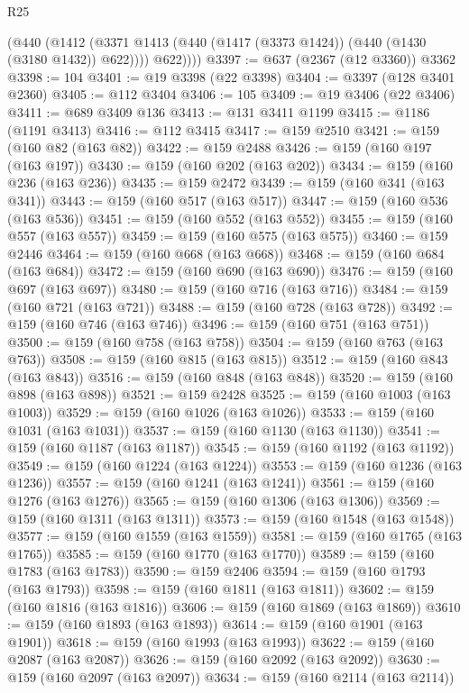 \begin{lexlean}{R25}
\begin{coremodule}
          (@440
            (@1412 (@3371 @1413 (@440 (@1417 (@3373 @1424)) (@440 (@1430 (@3180 @1432)) @622))))
            @622))))
@3397 := @637 (@2367 (@12 @3360)) @3362
@3398 := 104
@3401 := @19 @3398 (@22 @3398)
@3404 := @3397 (@128 @3401 @2360)
@3405 := @112 @3404
@3406 := 105
@3409 := @19 @3406 (@22 @3406)
@3411 := @689 @3409 @136
@3413 := @131 @3411 @1199
@3415 := @1186 (@1191 @3413)
@3416 := @112 @3415
@3417 := @159 @2510
@3421 := @159 (@160 @82 (@163 @82))
@3422 := @159 @2488
@3426 := @159 (@160 @197 (@163 @197))
@3430 := @159 (@160 @202 (@163 @202))
@3434 := @159 (@160 @236 (@163 @236))
@3435 := @159 @2472
@3439 := @159 (@160 @341 (@163 @341))
@3443 := @159 (@160 @517 (@163 @517))
@3447 := @159 (@160 @536 (@163 @536))
@3451 := @159 (@160 @552 (@163 @552))
@3455 := @159 (@160 @557 (@163 @557))
@3459 := @159 (@160 @575 (@163 @575))
@3460 := @159 @2446
@3464 := @159 (@160 @668 (@163 @668))
@3468 := @159 (@160 @684 (@163 @684))
@3472 := @159 (@160 @690 (@163 @690))
@3476 := @159 (@160 @697 (@163 @697))
@3480 := @159 (@160 @716 (@163 @716))
@3484 := @159 (@160 @721 (@163 @721))
@3488 := @159 (@160 @728 (@163 @728))
@3492 := @159 (@160 @746 (@163 @746))
@3496 := @159 (@160 @751 (@163 @751))
@3500 := @159 (@160 @758 (@163 @758))
@3504 := @159 (@160 @763 (@163 @763))
@3508 := @159 (@160 @815 (@163 @815))
@3512 := @159 (@160 @843 (@163 @843))
@3516 := @159 (@160 @848 (@163 @848))
@3520 := @159 (@160 @898 (@163 @898))
@3521 := @159 @2428
@3525 := @159 (@160 @1003 (@163 @1003))
@3529 := @159 (@160 @1026 (@163 @1026))
@3533 := @159 (@160 @1031 (@163 @1031))
@3537 := @159 (@160 @1130 (@163 @1130))
@3541 := @159 (@160 @1187 (@163 @1187))
@3545 := @159 (@160 @1192 (@163 @1192))
@3549 := @159 (@160 @1224 (@163 @1224))
@3553 := @159 (@160 @1236 (@163 @1236))
@3557 := @159 (@160 @1241 (@163 @1241))
@3561 := @159 (@160 @1276 (@163 @1276))
@3565 := @159 (@160 @1306 (@163 @1306))
@3569 := @159 (@160 @1311 (@163 @1311))
@3573 := @159 (@160 @1548 (@163 @1548))
@3577 := @159 (@160 @1559 (@163 @1559))
@3581 := @159 (@160 @1765 (@163 @1765))
@3585 := @159 (@160 @1770 (@163 @1770))
@3589 := @159 (@160 @1783 (@163 @1783))
@3590 := @159 @2406
@3594 := @159 (@160 @1793 (@163 @1793))
@3598 := @159 (@160 @1811 (@163 @1811))
@3602 := @159 (@160 @1816 (@163 @1816))
@3606 := @159 (@160 @1869 (@163 @1869))
@3610 := @159 (@160 @1893 (@163 @1893))
@3614 := @159 (@160 @1901 (@163 @1901))
@3618 := @159 (@160 @1993 (@163 @1993))
@3622 := @159 (@160 @2087 (@163 @2087))
@3626 := @159 (@160 @2092 (@163 @2092))
@3630 := @159 (@160 @2097 (@163 @2097))
@3634 := @159 (@160 @2114 (@163 @2114))

\end{coremodule}
\end{lexlean}

